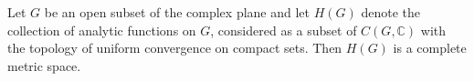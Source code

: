 Let $G$ be an open subset of the complex plane and let $H(G)$ denote the collection of analytic functions on $G$, considered as a subset of $C(G, \mathbb{C})$ with the topology of uniform convergence on compact sets. Then $H(G)$ is a complete metric space.
